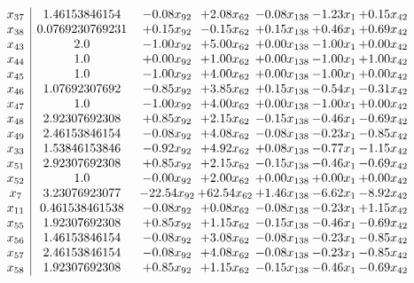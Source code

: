 \documentclass[8pt]{article}
\begin{document}
\[\begin{array}{c| c c@{\hskip 2pt} c@{\hskip 2pt} c@{\hskip 2pt} c@{\hskip 2pt} c@{\hskip 2pt} }
 x_{37}   &  1.46153846154 & -0.08 x_{92} & +  2.08 x_{62} & -0.08 x_{138} & -1.23 x_{1} & +  0.15 x_{42}\\
 x_{38}   &  0.0769230769231 & +  0.15 x_{92} & -0.15 x_{62} & +  0.15 x_{138} & +  0.46 x_{1} & +  0.69 x_{42}\\
 x_{43}   &  2.0 & -1.00 x_{92} & +  5.00 x_{62} & +  0.00 x_{138} & -1.00 x_{1} & +  0.00 x_{42}\\
 x_{44}   &  1.0 & +  0.00 x_{92} & +  1.00 x_{62} & +  0.00 x_{138} & -1.00 x_{1} & +  1.00 x_{42}\\
 x_{45}   &  1.0 & -1.00 x_{92} & +  4.00 x_{62} & +  0.00 x_{138} & -1.00 x_{1} & +  0.00 x_{42}\\
 x_{46}   &  1.07692307692 & -0.85 x_{92} & +  3.85 x_{62} & +  0.15 x_{138} & -0.54 x_{1} & -0.31 x_{42}\\
 x_{47}   &  1.0 & -1.00 x_{92} & +  4.00 x_{62} & +  0.00 x_{138} & -1.00 x_{1} & +  0.00 x_{42}\\
 x_{48}   &  2.92307692308 & +  0.85 x_{92} & +  2.15 x_{62} & -0.15 x_{138} & -0.46 x_{1} & -0.69 x_{42}\\
 x_{49}   &  2.46153846154 & -0.08 x_{92} & +  4.08 x_{62} & -0.08 x_{138} & -0.23 x_{1} & -0.85 x_{42}\\
 x_{33}   &  1.53846153846 & -0.92 x_{92} & +  4.92 x_{62} & +  0.08 x_{138} & -0.77 x_{1} & -1.15 x_{42}\\
 x_{51}   &  2.92307692308 & +  0.85 x_{92} & +  2.15 x_{62} & -0.15 x_{138} & -0.46 x_{1} & -0.69 x_{42}\\
 x_{52}   &  1.0 & -0.00 x_{92} & +  2.00 x_{62} & +  0.00 x_{138} & +  0.00 x_{1} & +  0.00 x_{42}\\
 x_{7}   &  3.23076923077 & -22.54 x_{92} & + 62.54 x_{62} & +  1.46 x_{138} & -6.62 x_{1} & -8.92 x_{42}\\
 x_{11}   &  0.461538461538 & -0.08 x_{92} & +  0.08 x_{62} & -0.08 x_{138} & -0.23 x_{1} & +  1.15 x_{42}\\
 x_{55}   &  1.92307692308 & +  0.85 x_{92} & +  1.15 x_{62} & -0.15 x_{138} & -0.46 x_{1} & -0.69 x_{42}\\
 x_{56}   &  1.46153846154 & -0.08 x_{92} & +  3.08 x_{62} & -0.08 x_{138} & -0.23 x_{1} & -0.85 x_{42}\\
 x_{57}   &  2.46153846154 & -0.08 x_{92} & +  4.08 x_{62} & -0.08 x_{138} & -0.23 x_{1} & -0.85 x_{42}\\
 x_{58}   &  1.92307692308 & +  0.85 x_{92} & +  1.15 x_{62} & -0.15 x_{138} & -0.46 x_{1} & -0.69 x_{42}\\

\end{array}\]
\end{document}

